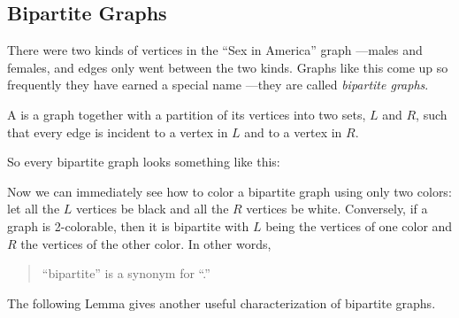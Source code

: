 \begin{problems}
\classproblems
{}


\homeworkproblems
{}

\examproblems
{}

\end{problems}

\label{bipartitesec}

\subsection{Bipartite Graphs}\label{bipartitesubsec}
There were two kinds of vertices in the ``Sex in America'' graph ---males
and females, and edges only went between the two kinds.  Graphs like this
come up so frequently they have earned a special name ---they are called
\emph{bipartite graphs}.

\begin{definition}
A  is a graph together with a partition of its
vertices into two sets, $L$ and $R$, such that every edge is incident to a
vertex in $L$ and to a vertex in $R$.
\end{definition}

So every bipartite graph looks something like this:


Now we can immediately see how to color a bipartite graph using only two
colors: let all the $L$ vertices be black and all the $R$ vertices be
white.  Conversely, if a graph is 2-colorable, then it is bipartite with
$L$ being the vertices of one color and $R$ the vertices of the other
color.  In other words,
\begin{quote}
``bipartite'' is a synonym for ``.''
\end{quote}
The following Lemma gives another useful characterization of bipartite
graphs.

